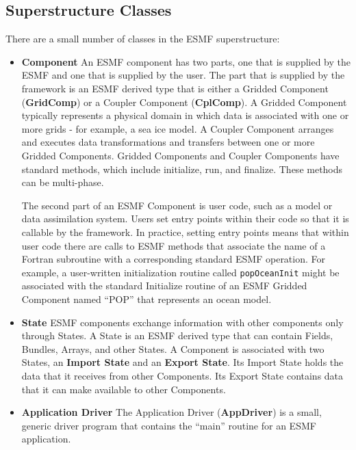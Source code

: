 \subsection{Superstructure Classes}

There are a small number of classes in the ESMF superstructure:

\begin{itemize}
\item {\bf Component}  An ESMF component has two parts, one that is 
supplied by the ESMF and one that is supplied by the user.  The
part that is supplied by the framework is an ESMF derived type that
is either a Gridded Component ({\bf GridComp}) or a Coupler 
Component ({\bf CplComp}).  A Gridded Component typically represents
a physical domain in which data is associated with one or more 
grids - for example, a sea ice model.  A Coupler Component 
arranges and executes data transformations and transfers between
one or more Gridded Components. Gridded Components and Coupler 
Components have standard methods, which include initialize, run,
and finalize.  These methods can be multi-phase.

The second part of an ESMF Component is user code, such as a
model or data assimilation system.  Users set entry points 
within their code so that it is callable by the framework.  
In practice, setting entry points means that within user code 
there are calls to ESMF methods that associate the name of a 
Fortran subroutine with a corresponding standard ESMF operation.  
For example, a user-written initialization routine called 
{\tt popOceanInit} might be associated with the standard 
Initialize routine of an ESMF Gridded Component named ``POP'' 
that represents an ocean model.

\item {\bf State}  ESMF components exchange information with other 
components only through States.  A State is an ESMF derived
type that can contain Fields, Bundles, Arrays, and other
States.  A Component is associated with two States, an 
{\bf Import State} and an {\bf Export State}.  Its Import State 
holds the data that it receives from other Components.  
Its Export State contains data that it can make available to 
other Components. 

\item {\bf Application Driver} The Application Driver ({\bf AppDriver}) 
is a small, generic driver program that contains the ``main'' 
routine for an ESMF application.

\end{itemize}

